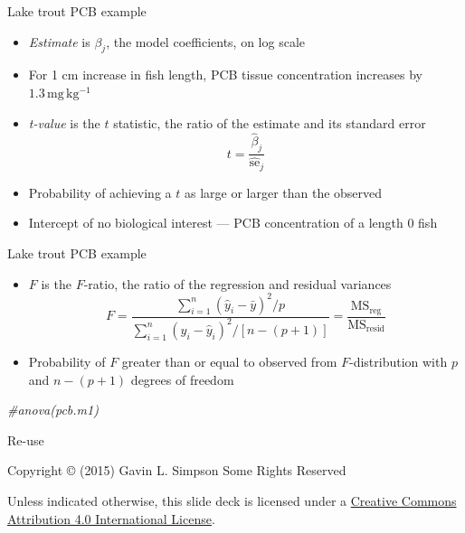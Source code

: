 \documentclass[10pt,ignorenonframetext,compress, aspectratio=169]{beamer}
\newenvironment{Shaded}{\begin{snugshade}}{\end{snugshade}}
\newcommand{\CommentTok}[1]{\textcolor[rgb]{0.56,0.35,0.01}{\textit{{#1}}}}
\providecommand{\tightlist}{%
  \setlength{\itemsep}{0pt}\setlength{\parskip}{0pt}}
\begin{document}
\begin{frame}{Lake trout PCB example}

\begin{itemize}
\tightlist
\item
  \emph{Estimate} is \(\beta_j\), the model coefficients, on log scale
\item
  For 1 cm increase in fish length, PCB tissue concentration increases
  by \(\mathrm{1.3 \, mg \, kg^{-1}}\)
\item
  \emph{t-value} is the \(t\) statistic, the ratio of the estimate and
  its standard error \[t = \frac{\hat{\beta}_j}{\hat{\mathrm{se}}_j}\]
\item
  Probability of achieving a \(t\) as large or larger than the observed
\item
  Intercept of no biological interest --- PCB concentration of a length
  0 fish
\end{itemize}

\scriptsize

\normalsize

\end{frame}

\begin{frame}[fragile]{Lake trout PCB example}

\begin{itemize}
\tightlist
\item
  \(F\) is the \(F\)-ratio, the ratio of the regression and residual
  variances
  \[F = \frac{\sum\limits^n_{i=1}(\hat{y}_i - \bar{y})^2 / p}{\sum\limits^n_{i=1}(y_i - \hat{y}_i)^2 / [n-(p+1)]} = \frac{\mathrm{MS_{reg}}}{\mathrm{MS_{resid}}}\]
\item
  Probability of \(F\) greater than or equal to observed from
  \(F\)-distribution with \(p\) and \(n - (p + 1)\) degrees of freedom
\end{itemize}

\scriptsize

\begin{Shaded}
\begin{Highlighting}[]
\CommentTok{#anova(pcb.m1)}
\end{Highlighting}
\end{Shaded}

\normalsize

\end{frame}

\begin{frame}{Re-use}

Copyright © (2015) Gavin L. Simpson Some Rights Reserved

Unless indicated otherwise, this slide deck is licensed under a
\href{http://creativecommons.org/licenses/by/4.0/}{Creative Commons
Attribution 4.0 International License}.

\begin{center}
  \ccby
\end{center}

\end{frame}
\end{document}
